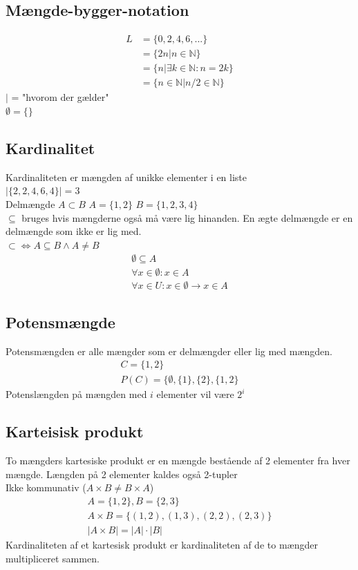 \documentclass[12pt, a4paper]{article}
\begin{document}
			\subsection{Mængde-bygger-notation}
				\begin{align*}
					L&=\{0,2,4,6,...\}\\
					 &=\{2n|n\in\mathbb{N}\}\\
					 &=\{n|\exists k \in \mathbb{N}:n=2k\}\\
					 &=\{n\in\mathbb{N}| n/2\in\mathbb{N}\}
				\end{align*}
				$|$ = "hvorom der gælder"\\
				$\emptyset = \{\}$\\
			\subsection{Kardinalitet}
				Kardinaliteten er mængden af unikke elementer i en liste\\
				$|\{2,2,4,6,4\}|=3$\\
				Delmængde $A\subset B$ $A=\{1,2\}$ $B=\{1,2,3,4\}$\\
				$\subseteq$ bruges hvis mængderne også må være lig hinanden. En ægte delmængde er en delmængde som ikke er lig med.\\
				$\subset \iff A\subseteq B \land A\neq B$
				\begin{align*}
					\emptyset \subseteq A\\
					\forall x \in \emptyset : x \in A\\
					\forall x \in U : x\in \emptyset \rightarrow x \in A
				\end{align*}
			\subsection{Potensmængde}
				Potensmængden er alle mængder som er delmængder eller lig med mængden.\\
				\begin{align*}
					C=\{1,2\}\\
					P(C)=\{\emptyset,\{1\},\{2\},\{1,2\}
				\end{align*}
				Potenslængden på mængden med $i$ elementer vil være $2^i$
			\subsection{Karteisisk produkt}
				To mængders kartesiske produkt er en mængde bestående af 2 elementer fra hver mængde. Længden på 2 elementer kaldes også 2-tupler\\
				Ikke kommunativ ($A\times B \neq B\times A$)\\
				\begin{align*}
					A=\{1,2\}, B=\{2,3\}\\
					A\times B = \{(1,2),(1,3),(2,2),(2,3)\}\\
					|A\times B| = |A| \cdot |B|
				\end{align*}
				Kardinaliteten af et kartesisk produkt er kardinaliteten af de to mængder multipliceret sammen.\\
\end{document}
